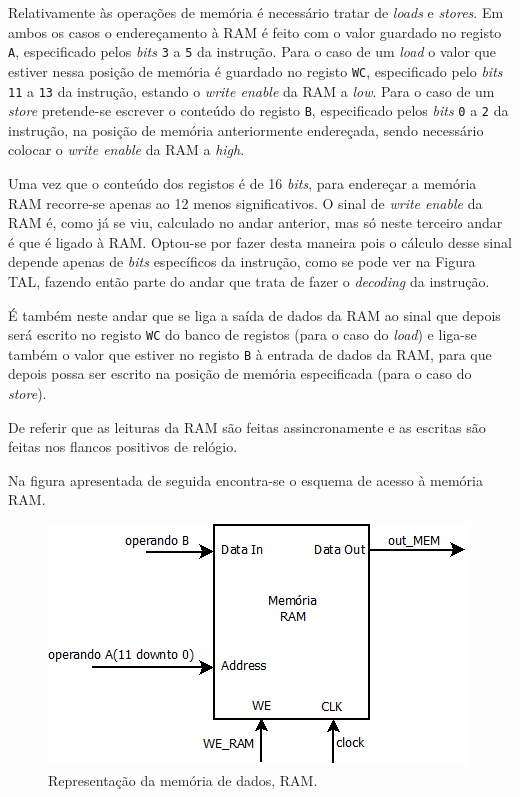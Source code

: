 \documentclass[11pt]{article}
\numberwithin{equation}{section}
\begin{document}
Relativamente às operações de memória é necessário tratar de \textit{loads} e \textit{stores}. Em ambos os casos o endereçamento à RAM é feito com o valor guardado no registo \texttt{A}, especificado pelos \textit{bits} \texttt{3} a \texttt{5} da instrução. Para o caso de um \textit{load} o valor que estiver nessa posição de memória é guardado no registo \texttt{WC}, especificado pelo \textit{bits} \texttt{11} a \texttt{13} da instrução, estando o \textit{write enable} da RAM a \textit{low}. Para o caso de um \textit{store} pretende-se escrever o conteúdo do registo \texttt{B}, especificado pelos \textit{bits} \texttt{0} a \texttt{2} da instrução, na posição de memória anteriormente endereçada, sendo necessário colocar o \textit{write enable} da RAM a \textit{high}. 

Uma vez que o conteúdo dos registos é de 16 \textit{bits}, para endereçar a memória RAM recorre-se apenas ao 12 menos significativos. O sinal de \textit{write enable} da RAM é, como já se viu, calculado no andar anterior, mas só neste terceiro andar é que é ligado à RAM. Optou-se por fazer desta maneira pois o cálculo desse sinal depende apenas de \textit{bits} específicos da instrução, como se pode ver na Figura TAL, fazendo então parte do andar que trata de fazer o \textit{decoding} da instrução.

É também neste andar que se liga a saída de dados da RAM ao sinal que depois será escrito no registo \texttt{WC} do banco de registos (para o caso do \textit{load}) e liga-se também o valor que estiver no registo \texttt{B} à entrada de dados da RAM, para que depois possa ser escrito na posição de memória especificada (para o caso do \textit{store}).

De referir que as leituras da RAM são feitas assincronamente e as escritas são feitas nos flancos positivos de relógio.

Na figura apresentada de seguida encontra-se o esquema de acesso à memória RAM.

\begin{figure}[H]
	\centering
	\includegraphics[keepaspectratio=true, scale=0.40]{imagens/RAM}
	\caption{Representação da memória de dados, RAM.}
	\vspace{-0.8em}
\end{figure}
\end{document}
